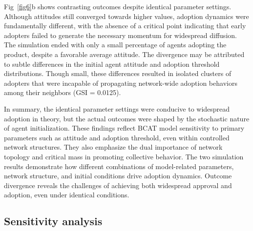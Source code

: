 \documentclass[10pt,letterpaper]{article}
\begin{document}
Fig~\ref{fig6}b shows contrasting outcomes despite identical parameter settings. Although attitudes still converged towards higher values, adoption dynamics were fundamentally different, with the absence of a critical point indicating that early adopters failed to generate the necessary momentum for widespread diffusion. The simulation ended with only a small percentage of agents adopting the product, despite a favorable average attitude. The divergence may be attributed to subtle differences in the initial agent attitude and adoption threshold distributions. Though small, these differences resulted in isolated clusters of adopters that were incapable of propagating network-wide adoption behaviors among their neighbors (GSI = 0.0125).

In summary, the identical parameter settings were conducive to widespread adoption in theory, but the actual outcomes were shaped by the stochastic nature of agent initialization. These findings reflect BCAT model sensitivity to primary parameters such as attitude and adoption threshold, even within controlled network structures. They also emphasize the dual importance of network topology and critical mass in promoting collective behavior. The two simulation results demonstrate how different combinations of model-related parameters, network structure, and initial conditions drive adoption dynamics. Outcome divergence reveals the challenges of achieving both widespread approval and adoption, even under identical conditions.

\subsection*{Sensitivity analysis}
\end{document}
